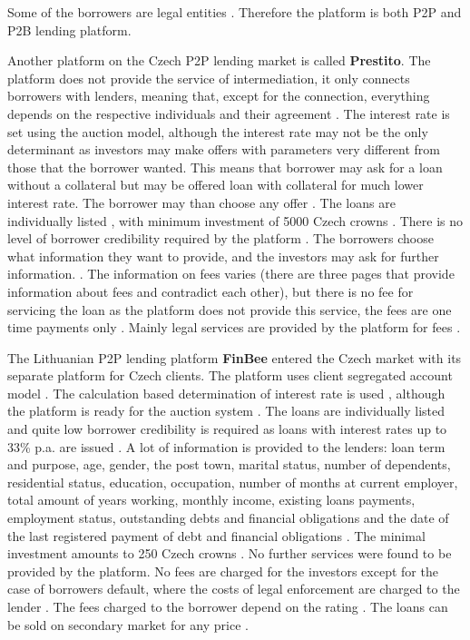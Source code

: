 Some of the borrowers are legal entities \cite[]{BondsterTrziste}. Therefore the platform is both P2P and P2B lending platform. 

Another platform on the Czech P2P lending market is called \textbf{Prestito}. The platform does not provide the service of intermediation, it only connects borrowers with lenders, meaning that, except for the connection, everything depends on the respective individuals and their agreement \cite[]{Prestito}. The interest rate is set using the auction model, although the interest rate may not be the only determinant as investors may make offers with parameters very different from those that the borrower wanted. This means that borrower may ask for a loan without a collateral but may be offered loan with collateral for much lower interest rate. The borrower may than choose any offer \cite[]{PrestitoFAQInv}. The loans are individually listed \cite[]{PrestitoTrziste}, with minimum investment of 5000 Czech crowns \cite[]{PrestitoFAQInv}. There is no level of borrower credibility required by the platform \cite[]{PrestitoFAQInv}. The borrowers choose what information they want to provide, and the investors may ask for further information. \cite[]{PrestitoFAQInv}. The information on fees varies (there are three pages that provide information about fees and contradict each other), but there is no fee for servicing the loan as the platform does not provide this service, the fees are one time payments only \cite[]{PrestitoPoplatky1, PrestitoPoplatky2, PrestitoPoplatky3}.  Mainly legal services are provided by the platform for fees \cite[]{Prestito}.

The Lithuanian P2P lending platform \textbf{FinBee} entered the Czech market with its separate platform for Czech clients. The platform uses client segregated account model \cite[]{FinbeeDohoda}. The calculation based determination of interest rate is used \cite[]{FinbeeDohoda}, although the platform is ready for the auction system \cite[]{FinbeeTrziste}. The loans are individually listed \cite[]{FinbeeTrziste} and quite low borrower credibility is required as loans with interest rates up to 33\% p.a. are issued \cite[]{FinbeeFAQ}. A lot of information is provided to the lenders: loan term and purpose, age, gender, the post town, marital status, number of dependents, residential status, education, occupation, number of months at current employer, total amount of years working, monthly income, existing loans payments, employment status, outstanding debts and financial obligations and the date of the last registered payment of debt and financial obligations \cite[]{FinbeeTrziste}. The minimal investment amounts to 250 Czech crowns \cite[]{FinbeeDohoda}. No further services were found to be provided by the platform. No fees are charged for the investors except for the case of borrowers default, where the costs of legal enforcement are charged to the lender \cite[]{FinbeeDohoda}. The fees charged to the borrower depend on the rating \cite[]{FinbeeFAQ}. The loans can be sold on secondary market for any price \cite[]{FinbeeDohoda}.

